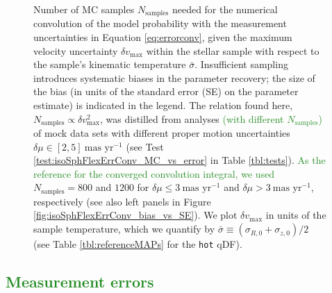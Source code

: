 \documentclass[iop,revtex4]{emulateapj}
\newcommand{\pdf}{\ensuremath{pdf}}
\newcommand{\NEW}[1]{\textcolor{ForestGreen}{#1}}
\newcommand{\OLD}[1]{}
\begin{document}
\begin{figure}[!htbp]
\caption{Number of MC samples $N_\text{samples}$ needed for the numerical convolution of the model probability with the measurement uncertainties in Equation \eqref{eq:errorconv}, given the maximum velocity uncertainty $\delta v_\text{max}$ within the stellar sample with respect to the sample's kinematic temperature $\bar{\sigma}$. Insufficient sampling introduces systematic biases in the parameter recovery; the size of the bias (in units of the standard error (SE) on the parameter estimate) is indicated in the legend. The relation found here, $N_\text{samples} \propto \delta v_\text{max}^2$, was distilled from analyses \NEW{(with different $N_\text{samples}$)} of mock data sets with different proper motion uncertainties $\delta \mu \in [2,5]~\text{mas yr}^{-1}$ \OLD{in the absence of position uncertainties} (see Test \ref{test:isoSphFlexErrConv_MC_vs_error} in Table \ref{tbl:tests}). \OLD{The proper motion uncertainty $\delta \mu$ translates to heteroscedastic velocity uncertainties according to $\delta v [\text{km s}^{-1}] \equiv 4.74047 \cdot r[\text{kpc}] \cdot \delta \mu [\text{mas yr}^{-1}]$, with $r$ being the distance of the star from the Sun. Stars with larger $\delta v$ require more $N_\text{samples}$ for the integral over its measurement uncertainties to converge; we therefore show how the $N_\text{samples}$---needed for the \pdf{} of the \emph{whole} data set to be converged---depends on the \emph{largest} velocity error $\delta v_\text{max} \equiv \delta v(r_\text{max})$ within the data set. We used} \NEW{As the reference for the converged convolution integral, we used} $N_\text{samples} = 800$ and  $1200$ for $\delta \mu \leq 3~\text{mas yr}^{-1}$ and $\delta \mu > 3~\text{mas yr}^{-1}$, respectively\OLD{, as the reference for the converged convolution integral} (see also left panels in Figure \ref{fig:isoSphFlexErrConv_bias_vs_SE}). We plot $\delta v_\text{max}$ in units of the sample temperature, which we quantify by $\bar{\sigma} \equiv (\sigma_{R,0} + \sigma_{z,0})/2$ (see Table \ref{tbl:referenceMAPs} for the \texttt{hot} qDF). \OLD{This figure was generated from mock data sets with $N_{*}=10,000$. We found that for $N_{*}=5,000$ the required $N_\text{samples}$ remains similar for $b$, but gets smaller for $v_\text{circ}(R_\odot)$. Overall we expect that we need less accuracy and therefore smaller $N_\text{samples}$ for smaller $N_{*}$.} }
\label{fig:isoSphFlexErrConv_MC_vs_error}
\end{figure}

\subsection{\NEW{Measurement errors}}
\end{document}
